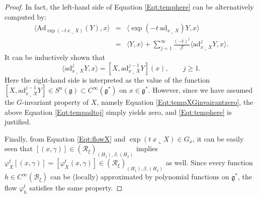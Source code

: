 \documentclass[12pt]{amsart}
\theoremstyle{definition}
\numberwithin{equation}{section}
\newcommand{\gstar}{\mathfrak{g}^*}
\newcommand{\galgebra}{\mathfrak{g}}
\newcommand{\Cinf}{C^\infty}
\newcommand{\Reducedxi}{\mathcal{R}_\xi}
\newcommand{\Bxi}{\mathcal{B}_{\xi}}
\newcommand{\Adjointaction}{\mathrm{Ad}}
\begin{document}
\begin{proof}
 
  In fact, the left-hand side of Equation \eqref{Eqt:temphere} can be alternatively computed by:
  \begin{eqnarray*}
    \langle  \Adjointaction_{\exp(-t ~x\llcorner X)}(Y),x \rangle &=& \langle  \exp( -t ~\mathrm{ad}_{x\llcorner X} ) Y,x \rangle \\
      &=& \langle Y, x \rangle+\sum_{j=1}^\infty \frac{(-t)^j}{j!} \langle \mathrm{ad}^j_{x\llcorner X}Y, x \rangle.
  \end{eqnarray*}
  It can be inductively shown that
  \begin{equation}\label{Eqt:tempadtoj}
   \langle \mathrm{ad}^j_{x\llcorner X}Y, x \rangle= {[X,\mathrm{ad}^{j-1}_{x\llcorner X}Y ]} (x),\qquad j\geqslant 1.
   \end{equation}
  Here the right-hand side is interpreted as the value of the function $[X,\mathrm{ad}^{j-1}_{x\llcorner X}Y ]\in S^n{(\galgebra)}\subset C^\infty(\gstar)$ on $x\in \gstar$. However, since we have assumed the $G$-invariant property of $X$, namely Equation \eqref{Eqt:tempXGinvairantzero}, the above Equation \eqref{Eqt:tempadtoj} simply yields zero, and \eqref{Eqt:temphere} is justified.
  
  Finally, from Equation \eqref{Eqt:flowX}  and $\exp(t ~x\llcorner X) \in G_x$, it can be easily seen that   $[(x,\gamma)]\in (\Reducedxi)_{(H_1),\beta,(H_2)}$ implies $\varphi^t_X[(x,\gamma)]=[\varphi^t_X(x,\gamma)]\in (\Reducedxi)_{(H_1),\beta,(H_2)}$ as well. Since every function $h \in \Cinf(\Bxi)$ can be (locally) approximated by  polynomial functions on $ \gstar$, the flow $\varphi^t_h$ satisfies the same property.
   
\end{proof}
   
\end{document}
